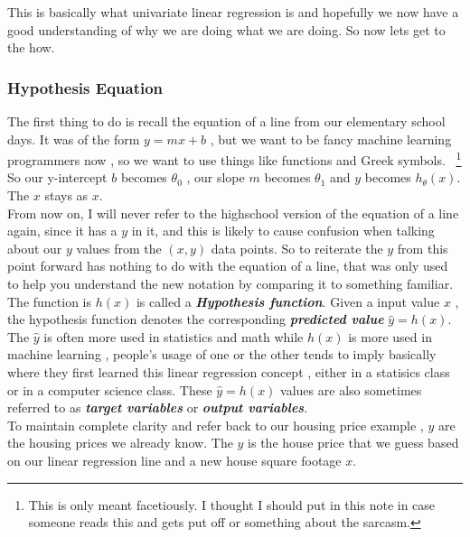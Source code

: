 This is basically what univariate linear regression is and hopefully we now have
a good understanding of why we are doing what we are doing. So now lets get to
the how.\\

\subsubsectionend
\subsubsection{Hypothesis Equation}
\label{sssec:equation}

The first thing to do is recall the equation of a line from our elementary
school days. It was of the form \( y=mx+b \) , but we want to be fancy machine
learning programmers now , so we want to use things like functions and Greek
symbols.  ~\footnote{This is only meant facetiously. I thought I should put in
	this note in case someone reads this and gets put off or something about
	the sarcasm.  } So our y-intercept \( b \) becomes \( \theta_{0} \) , our
slope \( m \) becomes \( \theta_{1} \) and \( y \) becomes \( h_{\theta}(x) \).
The \( x \) stays as \( x \).\\

From now on, I will never refer to the highschool version of the equation of a
line again, since it has a \( y \) in it, and this is likely to cause
confusion when talking about our \( y \) values from the \( (x,y) \) data
points. So to reiterate the \( y \) from this point forward has nothing to do
with the equation of a line, that was only used to help you understand the new
notation by comparing it to something familiar.\\

The function is \( h(x) \) is called a \textbf{\textit{Hypothesis function}}.
Given a input value \( x \) , the hypothesis function denotes the corresponding
\textbf{\textit{predicted value}} \( \hat{y} = h(x) \). The \( \hat{y} \) is
often more used in statistics and math while \( h(x) \) is more used in machine
learning , people's usage of one or the other tends to imply basically where
they first learned this linear regression concept , either in a statisics class
or in a computer science class. These \( \hat{y} = h(x) \) values are also
sometimes referred to as \textbf{\textit{target variables}} or
\textbf{\textit{output variables}}.  \\

To maintain complete clarity and refer back to our housing price example
, \( y \) are the housing prices we already know. The \( \hat{y} \) is the
house price that we guess based on our linear regression line and a new house
square footage \( x \).

